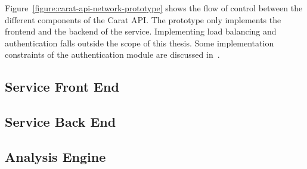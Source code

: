 Figure~\ref{figure:carat-api-network-prototype} shows the flow of control between the different components of the Carat API. The prototype only implements the frontend and the backend of the service. Implementing load balancing and authentication falls outside the scope of this thesis. Some implementation constraints of the authentication module are discussed in~\cite{7840871}.     

\subsection{Service Front End}

\subsection{Service Back End}

\subsection{Analysis Engine}
